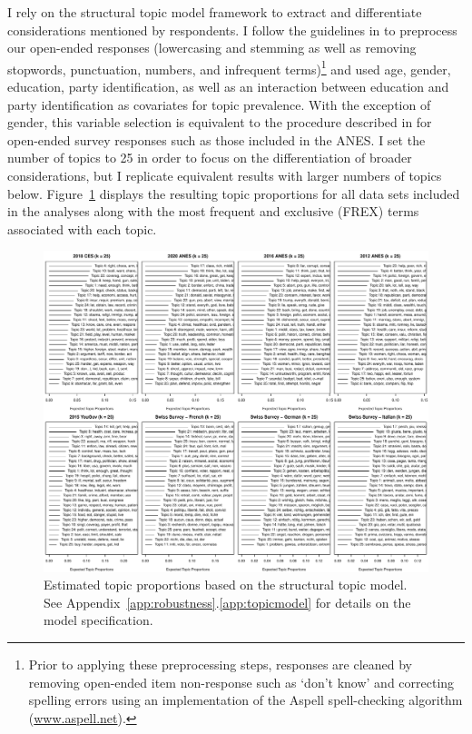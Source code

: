 \documentclass[12pt]{article}
\begin{document}
I rely on the structural topic model framework to extract and differentiate considerations mentioned by respondents. I follow the guidelines in \citet{roberts2014structural} to preprocess our open-ended responses (lowercasing and stemming as well as removing stopwords, punctuation, numbers, and infrequent terms)\footnote{Prior to applying these preprocessing steps, responses are cleaned by removing open-ended item non-response such as `don't know' and correcting spelling errors using an implementation of the Aspell spell-checking algorithm (\url{www.aspell.net}).} and used age, gender, education, party identification, as well as an interaction between education and party identification as covariates for topic prevalence. With the exception of gender, this variable selection is equivalent to the procedure described in \citet{roberts2014structural} for open-ended survey responses such as those included in the ANES. I set the number of topics to 25 in order to focus on the differentiation of broader considerations, but I replicate equivalent results with larger numbers of topics below. Figure~\ref{fig:stm_prop} displays the resulting topic proportions for all data sets included in the analyses along with the most frequent and exclusive (FREX) terms associated with each topic.

\begin{figure}[h]\centering
	\includegraphics[width=.89\textwidth]{../out/appB3-stm_prop.pdf}
	\caption[Estimated topic proportions based on the structural topic model]{Estimated topic proportions based on the structural topic model. See Appendix~\ref{app:robustness}.\ref{app:topicmodel} for details on the model specification.}\label{fig:stm_prop}
\end{figure}
\end{document}
